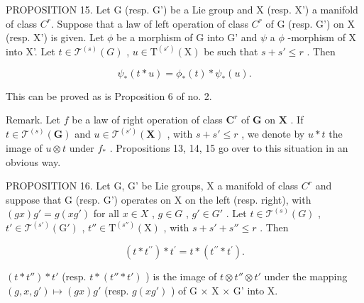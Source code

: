 PROPOSITION 15. Let G (resp. G') be a Lie group and X (resp. X') a manifold of class \(C^{r}\). Suppose that a law of left operation of class \(C^{r}\) of G (resp. G') on X (resp. X') is given. Let \(\phi\) be a morphism of G into G' and \(\psi\) a \(\phi\) -morphism of X into X'. Let \(t \in \mathcal{T}^{(s)}(G)\) , \(u \in \mathrm{T}^{(s')}(\mathrm{X})\) be such that \(s + s' \leqslant r\) . Then

\[
\psi_ {*} (t * u) = \phi_ {*} (t) * \psi_ {*} (u).
\]

This can be proved as is Proposition 6 of no. 2.

Remark. Let \(f\) be a law of right operation of class \(\mathbf{C}^r\) of \(\mathbf{G}\) on \(\mathbf{X}\) . If \(t \in \mathcal{T}^{(s)}(\mathbf{G})\) and \(u \in \mathcal{T}^{(s')}(\mathbf{X})\) , with \(s + s' \leqslant r\) , we denote by \(u * t\) the image of \(u \otimes t\) under \(f_*\) . Propositions 13, 14, 15 go over to this situation in an obvious way.

PROPOSITION 16. Let G, G' be Lie groups, X a manifold of class \(C^{r}\) and suppose that G (resp. G') operates on X on the left (resp. right), with \((gx)g' = g(xg')\) for all \(x \in X\) , \(g \in G\) , \(g' \in G'\) . Let \(t \in \mathcal{T}^{(s)}(G)\) , \(t' \in \mathcal{T}^{(s')}(\mathrm{G}')\) , \(t'' \in \mathrm{T}^{(s'')}(\mathrm{X})\) , with \(s + s' + s'' \leqslant r\) . Then

\[
(t * t ^ {\prime \prime}) * t ^ {\prime} = t * (t ^ {\prime \prime} * t ^ {\prime}).
\]

\((t*t'')*t'\) (resp. \(t*(t''*t')\) ) is the image of \(t\otimes t''\otimes t'\) under the mapping \((g,x,g')\mapsto(gx)g'\) (resp. \(g(xg')\) ) of G × X × G' into X.

